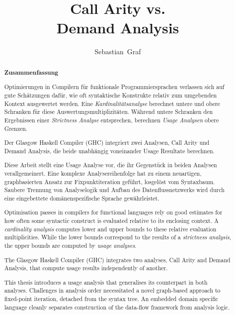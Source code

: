 \documentclass[12pt,a4paper,twoside,headings=openright]{scrreprt}
\title{Call Arity vs.\\Demand Analysis}
\author{Sebastian~Graf}
\begin{document}
\begin{otherlanguage}{ngerman} %
\mytitlepage
\end{otherlanguage}

\begin{abstract}
\begin{center}\Huge\textbf{\textsf{Zusammenfassung}}
\end{center}
\vfill

  Optimierungen in Compilern für funktionale Programmiersprachen verlassen sich auf gute Schätzungen dafür, wie oft syntaktische Konstrukte relativ zum umgebenden Kontext ausgewertet werden.
  Eine \emph{Kardinalitätsanalyse} berechnet untere und obere Schranken für diese Auswertungsmultiplizitäten.
  Während untere Schranken den Ergebnissen einer \emph{Strictness Analyse} entsprechen, berechnen \emph{Usage Analysen} obere Grenzen.

  Der Glasgow Haskell Compiler (GHC) integriert zwei Analysen, Call Arity und Demand Analysis, die beide unabhängig voneinander Usage Resultate berechnen.

  Diese Arbeit stellt eine Usage Analyse vor, die ihr Gegenstück in beiden Analysen verallgemeinert.
  Eine komplexe Analysereihenfolge hat zu einem neuartigen, graphbasierten Ansatz zur Fixpunktiteration geführt, losgelöst vom Syntaxbaum.
  Saubere Trennung von Analyselogik und Aufbau des Datenflussnetzwerks wird durch eine eingebettete domänenspezifische Sprache gewährleistet.
  
\vfill

  Optimisation passes in compilers for functional languages rely on good estimates for how often some syntactic construct is evaluated relative to its enclosing context.
  A \emph{cardinality analysis} computes lower and upper bounds to these relative evaluation multiplicities.
  While the lower bounds correspond to the results of a \emph{strictness analysis}, the upper bounds are computed by \emph{usage analyses}.

  The Glasgow Haskell Compiler (GHC) integrates two analyses, Call Arity and Demand Analysis, that compute usage results independently of another.

  This thesis introduces a usage analysis that generalises its counterpart in both analyses.
  Challenges in analysis order necessitated a novel graph-based approach to fixed-point iteration, detached from the syntax tree.
  An embedded domain specific language cleanly separates construction of the data-flow framework from analysis logic.

\vfill

\end{abstract}
\end{document}
